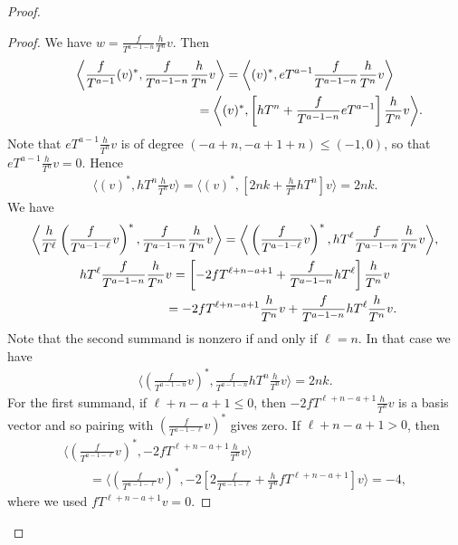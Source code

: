 \documentclass[pdftex]{sigma}
\numberwithin{equation}{section}
\begin{document}
\begin{proof}
\begin{proof}
We have $w = \frac{f}{T^{a-1-n}}\frac{h}{T^n} v $. Then
\begin{gather*}
\bigg\langle \frac{f}{T^{a-1}} (v)^*, \frac{f}{T^{a-1-n}}\frac{h}{T^n} v \bigg\rangle = \bigg\langle (v)^*, eT^{a-1} \frac{f}{T^{a-1-n}}\frac{h}{T^n} v \bigg\rangle \\
\hphantom{\bigg\langle \frac{f}{T^{a-1}} (v)^*, \frac{f}{T^{a-1-n}}\frac{h}{T^n} v \bigg\rangle }
= \bigg\langle (v)^*, \left[ hT^n + \frac{f}{T^{a-1-n}} eT^{a-1} \right] \frac{h}{T^n} v \bigg\rangle.
\end{gather*}
Note that $eT^{a-1} \frac{h}{T^n}v$ is of degree $(-a+n, -a+1+n) \leq (-1,0)$, so that $eT^{a-1} \frac{h}{T^n} v = 0$. Hence
\begin{gather*}
\bigg\langle (v)^*, hT^n \frac{h}{T^n} v \bigg\rangle = \bigg\langle (v)^*, \left[2nk + \frac{h}{T^n} hT^n\right] v \bigg\rangle = 2 n k.
\end{gather*}
We have
\begin{gather*}
\bigg\langle \frac{h}{T^{\ell}} \left(\frac{f}{T^{a-1-\ell}}v\right)^*,
\frac{f}{T^{a-1-n}}\frac{h}{T^n} v \bigg\rangle = \bigg\langle \left(\frac{f}{T^{a-1-\ell}}v\right)^*, hT^{\ell} \frac{f}{T^{a-1-n}}\frac{h}{T^n} v \bigg\rangle,\\
hT^{\ell} \frac{f}{T^{a-1-n}}\frac{h}{T^n} v = \left[ -2 fT^{\ell+n-a+1} + \frac{f}{T^{a-1-n}} hT^{\ell} \right] \frac{h}{T^n} v \\
\hphantom{hT^{\ell} \frac{f}{T^{a-1-n}}\frac{h}{T^n} v} = -2 fT^{\ell+n-a+1} \frac{h}{T^n} v + \frac{f}{T^{a-1-n}} hT^{\ell} \frac{h}{T^n} v.
\end{gather*}
Note that the second summand is nonzero if and only if $\ell=n$. In that case we have
\begin{gather*}
\bigg\langle \left(\frac{f}{T^{a-1-n}}v\right)^*, \frac{f}{T^{a-1-n}} hT^n \frac{h}{T^n} v \bigg\rangle = 2nk.
\end{gather*}
For the first summand, if $\ell+n-a+1 \leq 0$, then $-2 fT^{\ell+n-a+1} \frac{h}{T^n} v$ is a basis vector and so pairing with $\left(\frac{f}{T^{a-1-\ell}}v\right)^*$ gives zero. If $\ell+n-a+1 > 0$, then
\begin{gather*}
\bigg\langle \left(\frac{f}{T^{a-1-\ell}}v\right)^*, -2 fT^{\ell+n-a+1} \frac{h}{T^n} v \bigg\rangle \\
\qquad {} = \bigg\langle \left(\frac{f}{T^{a-1-\ell}}v\right)^*, -2 \left[ 2\frac{f}{T^{a-1-\ell}} + \frac{h}{T^n} fT^{\ell+n-a+1}\right] v \bigg\rangle = - 4,
\end{gather*}
where we used $fT^{\ell+n-a+1}v = 0$.


\end{proof}
\end{proof}
\end{document}
